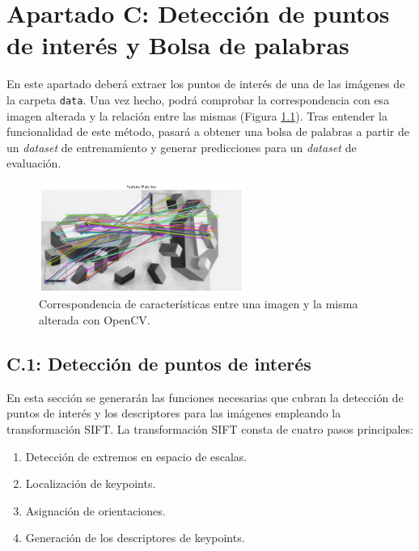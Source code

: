 \chapter{Apartado C: \textbf{Detección de puntos de interés y Bolsa de palabras}}
\label{chapter:tarea_c}

En este apartado deberá extraer los puntos de interés de una de las imágenes de la carpeta \texttt{data}. Una vez hecho, podrá comprobar la correspondencia con esa imagen alterada y la relación entre las mismas (Figura \ref{fig:feat_match}). Tras entender la funcionalidad de este método, pasará a obtener una bolsa de palabras a partir de un \textit{dataset} de entrenamiento y generar predicciones para un \textit{dataset} de evaluación.

\begin{figure}[h]
    \centering
    \includegraphics[width=0.6\textwidth]{Lab_3/template/figures/FeatureMatch.png}
    \caption{Correspondencia de características entre una imagen y la misma alterada con OpenCV.}
    \label{fig:feat_match}
\end{figure}

\section*{C.1: Detección de puntos de interés}
{}

En esta sección se generarán las funciones necesarias que cubran la detección de puntos de interés y los descriptores para las imágenes empleando la transformación SIFT.
La transformación SIFT consta de cuatro pasos principales:

\begin{enumerate}
    \item Detección de extremos en espacio de escalas.
    \item Localización de keypoints.
    \item Asignación de orientaciones.
    \item Generación de los descriptores de keypoints.
\end{enumerate}

